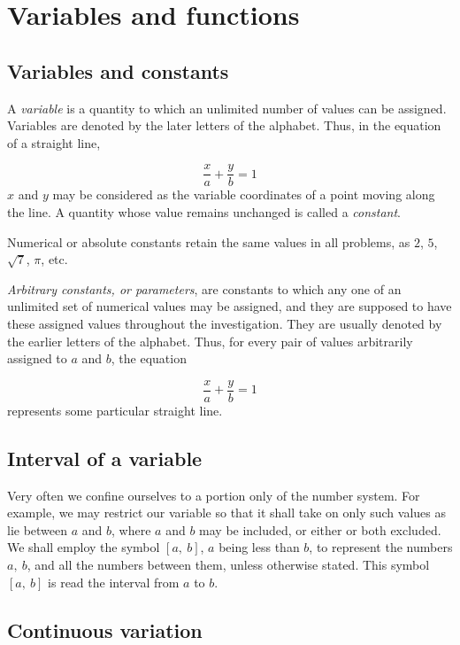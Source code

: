 \chapter{Variables and functions}
 
\section{Variables and constants} 

A {\it variable} is a quantity to which an unlimited number of values 
can be assigned. Variables are denoted by the later letters of 
the alphabet. Thus, in the equation of a straight line,

\[
    \frac{x}{a} + \frac{y}{b} = 1
\]
$x$ and $y$ may be considered as the variable coordinates of a 
point moving along the line.
A quantity whose value remains unchanged is called a {\it constant}.

Numerical or absolute constants retain the same values in all problems, 
as $2$, $5$, $\sqrt{7}$, $\pi$, etc.

{\it Arbitrary constants, or parameters}, are constants to which any 
one of an unlimited set of numerical values may be assigned, 
and they are supposed to have these assigned values throughout 
the investigation. They are usually denoted by the earlier 
letters of the alphabet. Thus, for every pair of values arbitrarily 
assigned to $a$ and $b$, the equation

\[
    \frac{x}{a} + \frac{y}{b} = 1
\]
represents some particular straight line.


\section{Interval of a variable} 

Very often we confine ourselves 
to a portion only of the number system. For example, we may 
restrict our variable so that it shall take on only such values 
as lie between $a$ and $b$, where $a$ and $b$ may be included, or 
either or both excluded. We shall employ the symbol 
$\left \lbrack a,\ b \right \rbrack$, $a$ being less than $b$, 
to represent the numbers $a,\ b$, and all the numbers between 
them, unless otherwise stated. This symbol 
$\left \lbrack a,\ b \right \rbrack$ is read the interval from 
$a$ to $b$.


\section{Continuous variation} 

